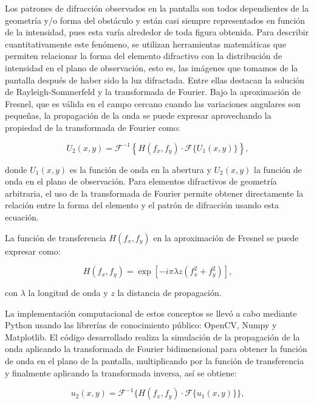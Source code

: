 \documentclass[6pt,a4paper]{article}
\begin{document}
Los patrones de difracción observados en la pantalla son todos dependientes de la geometría y/o forma del obstáculo y están casi siempre representados en función de la intensidad, pues esta varía alrededor de toda figura obtenida. Para describir cuantitativamente este fenómeno, se utilizan herramientas matemáticas que permiten relacionar la forma del elemento difractivo con la distribución de intensidad en el plano de observación, esto es, las imágenes que tomamos de la pantalla después de haber sido la luz difractada. Entre ellas destacan la solución de Rayleigh-Sommerfeld y la transformada de Fourier. Bajo la aproximación de Fresnel, que es válida en el campo cercano cuando las variaciones angulares son pequeñas, la propagación de la onda se puede expresar aprovechando la propiedad de la transformada de Fourier como:

\begin{equation}
U_2(x,y) = \mathcal{F}^{-1} \left\{ H(f_x,f_y) \cdot \mathcal{F} \{ U_1(x,y) \} \right\},
\end{equation}

donde \( U_1(x,y) \) es la función de onda en la abertura y \( U_2(x,y) \) la función de onda en el plano de observación. Para elementos difractivos de geometría arbitraria, el uso de la transformada de Fourier permite obtener directamente la relación entre la forma del elemento y el patrón de difracción usando esta ecuación.

La función de transferencia \( H(f_x,f_y) \) en la aproximación de Fresnel se puede expresar como:

\begin{equation}
H(f_x,f_y) = \exp\left[-i \pi \lambda z (f_x^2 + f_y^2)\right],
\end{equation}

con \( \lambda \) la longitud de onda y \( z \) la distancia de propagación.

La implementación computacional de estos conceptos se llevó a cabo mediante Python usando las librerías de conocimiento público: OpenCV, Numpy y Matplotlib. El código desarrollado realiza la simulación de la propagación de la onda aplicando la transformada de Fourier bidimensional para obtener la función de onda en el plano de la pantalla, multiplicando por la función de transferencia y finalmente aplicando la transformada inversa, así se obtiene:

\begin{equation}
u_2(x,y) = \mathcal{F}^{-1}\{ H(f_x,f_y) \cdot \mathcal{F}\{ u_1(x,y) \} \},
\end{equation}
\end{document}
